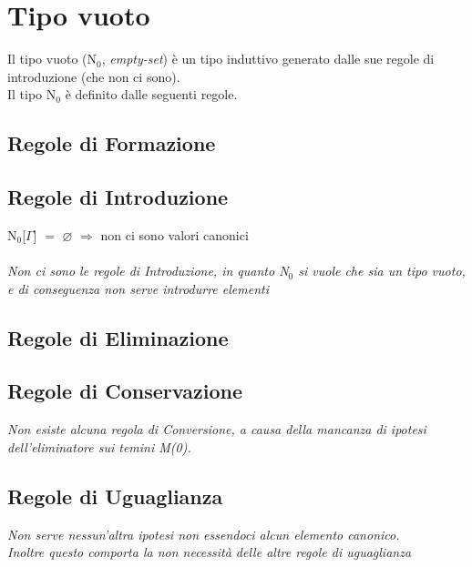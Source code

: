 \chapter{Tipo vuoto}
\label{cap: N0}
Il tipo vuoto (N$_0$, \textit{empty-set}) \`e un tipo induttivo generato dalle sue regole di introduzione (che non ci sono). \\ Il tipo N$_0$ \`e definito dalle seguenti regole.

\section{Regole di Formazione}
\label{sec: formazione-N0}
\begin{prooftree}
\end{prooftree}

\section{Regole di Introduzione}
\label{sec: introduzione-N0}
N$_0$[$\Gamma$] $=$ $\varnothing$ $\Rightarrow$ non ci sono valori canonici\\\\
\noindent
\textit{Non ci sono le regole di Introduzione, in quanto N$_0$ si vuole che sia un tipo vuoto, e di conseguenza non serve introdurre elementi}

\section{Regole di Eliminazione}
\label{sec: eliminazione-N0}
\begin{prooftree}
\end{prooftree}

\section{Regole di Conservazione}
\label{sec: conservazione-funzione}
\textit{Non esiste alcuna regola di Conversione, a causa della mancanza di ipotesi dell'eliminatore sui temini M(0).}

\section{Regole di Uguaglianza}
\label{sec: uguaglianza-funzione}
\begin{prooftree}
\end{prooftree}
\noindent
\textit{Non serve nessun'altra ipotesi non essendoci alcun elemento canonico.\\ Inoltre questo comporta la non necessit\`a delle altre regole di uguaglianza}

